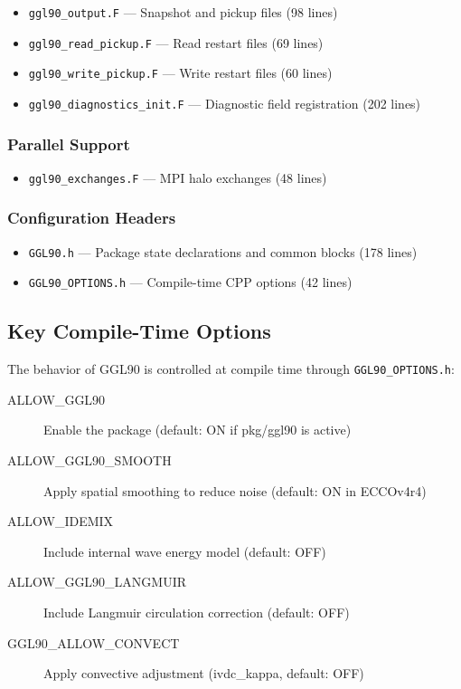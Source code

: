 \documentclass[11pt, a4paper]{article}
\begin{document}
\begin{itemize}
    \item \texttt{ggl90\_output.F} — Snapshot and pickup files (98 lines)
    \item \texttt{ggl90\_read\_pickup.F} — Read restart files (69 lines)
    \item \texttt{ggl90\_write\_pickup.F} — Write restart files (60 lines)
    \item \texttt{ggl90\_diagnostics\_init.F} — Diagnostic field registration (202 lines)
\end{itemize}

\subsubsection{Parallel Support}

\begin{itemize}
    \item \texttt{ggl90\_exchanges.F} — MPI halo exchanges (48 lines)
\end{itemize}

\subsubsection{Configuration Headers}

\begin{itemize}
    \item \texttt{GGL90.h} — Package state declarations and common blocks (178 lines)
    \item \texttt{GGL90\_OPTIONS.h} — Compile-time CPP options (42 lines)
\end{itemize}

\subsection{Key Compile-Time Options}

The behavior of GGL90 is controlled at compile time through \texttt{GGL90\_OPTIONS.h}:

\begin{description}
    \item[ALLOW\_GGL90] Enable the package (default: ON if pkg/ggl90 is active)
    \item[ALLOW\_GGL90\_SMOOTH] Apply spatial smoothing to reduce noise (default: ON in ECCOv4r4)
    \item[ALLOW\_IDEMIX] Include internal wave energy model (default: OFF)
    \item[ALLOW\_GGL90\_LANGMUIR] Include Langmuir circulation correction (default: OFF)
    \item[GGL90\_ALLOW\_CONVECT] Apply convective adjustment (ivdc\_kappa, default: OFF)
\end{description}
\end{document}
